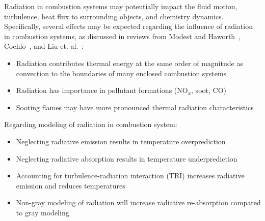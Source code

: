 Radiation in combustion systems may potentially impact the fluid motion, turbulence, heat flux to surrounding objects, and chemistry dynamics. Specifically, several effects may be expected regarding the influence of radiation in combustion systems, as discussed in reviews from Modest and Haworth~\cite{Modest2016RadiativeSystems}, Coehlo~\cite{Coelho2018RadiativeSystems}, and Liu et. al.~\cite{Liu2020TheFlames}:
\begin{itemize}
    \item Radiation contributes thermal energy at the same order of magnitude as convection to the boundaries of many enclosed combustion systems~\cite{Gamil2020AssessmentChamber,Johnson2021AnalysisMethod}
    \item Radiation has importance in pollutant formations (NO${}_x$, soot, CO)~\cite{Ihme2008ModelingFormulation,Habibi2007TurbulenceFlames}
    \item Sooting flames may have more pronounced thermal radiation characteristics
\end{itemize}
Regarding modeling of radiation in combustion system:
\begin{itemize}
    \item Neglecting radiative emission results in temperature overprediction~\cite{Gamil2020AssessmentChamber}
    \item Neglecting radiative absorption results in temperature underprediction
    \item Accounting for turbulence-radiation interaction (TRI) increases radiative emission and reduces temperatures
    \item Non-gray modeling of radiation will increase radiative re-absorption compared to gray modeling~\cite{Wu2021LimitationsFires}
\end{itemize}



